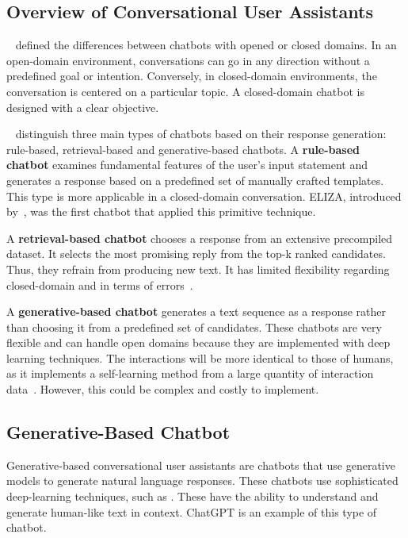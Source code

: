 \subsection{Overview of Conversational User Assistants}

~\citet{nuruzzaman_survey_2018} defined the differences between chatbots with opened or closed domains. In an open-domain environment, conversations can go in any direction without a predefined goal or intention. Conversely, in closed-domain environments, the conversation is centered on a particular topic. A closed-domain chatbot is designed with a clear objective.

~\citet{peng_survey_2019} distinguish three main types of chatbots based on their response generation: rule-based, retrieval-based and generative-based chatbots. A \textbf{rule-based chatbot} examines fundamental features of the user's input statement and generates a response based on a predefined set of manually crafted templates. This type is more applicable in a closed-domain conversation. ELIZA, introduced by~\citet{weizenbaum_elizacomputer_1966}, was the first chatbot that applied this primitive technique.

A \textbf{retrieval-based chatbot} chooses a response from an extensive precompiled dataset. It selects the most promising reply from the top-k ranked candidates. Thus, they refrain from producing new text. It has limited flexibility regarding closed-domain and in terms of errors~\cite{agarwal_review_2020}.

A \textbf{generative-based chatbot} generates a text sequence as a response rather than choosing it from a predefined set of candidates. These chatbots are very flexible and can handle open domains because they are implemented with deep learning techniques. The interactions will be more identical to those of humans, as it implements a self-learning method from a large quantity of interaction data~\cite{peng_survey_2019, agarwal_review_2020}. However, this could be complex and costly to implement.


\subsection{Generative-Based Chatbot}

Generative-based conversational user assistants are chatbots that use generative models to generate natural language responses. These chatbots use sophisticated deep-learning techniques, such as {\llm}. These have the ability to understand and generate human-like text in context. ChatGPT is an example of this type of chatbot.


